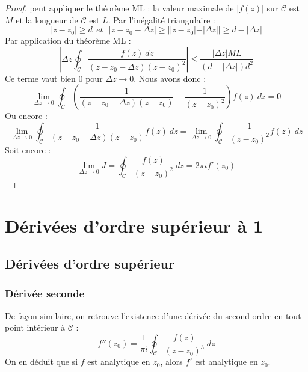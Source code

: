 \begin{proof}
	peut appliquer le théorème ML : la valeur maximale de $|f(z)|$ sur $\mathcal{C}$ est $M$ et la
	longueur de $\mathcal{C}$ est $L$. Par l'inégalité triangulaire :
	\begin{equation}
		|z-z_0| \geq d\ \ et\ \ \ |z-z_0-\Delta z| \geq ||z-z_0| - |\Delta z|| \geq d - |\Delta z|
	\end{equation}
	Par application du théorème ML :
	\begin{equation}
		\left|\Delta z\oint_\mathcal{C} \dfrac{f(z)\ dz}{(z-z_0-\Delta z)(z-z_0)^2}\right| \leq 
		\dfrac{|\Delta z|ML}{(d-|\Delta z|)d^2}
	\end{equation}
	Ce terme vaut bien 0 pour $\Delta z \rightarrow 0$. Nous avons donc :
	\begin{equation}
		\lim\limits_{\Delta z \rightarrow 0} \oint_\mathcal{C}\left(\dfrac{1}{(z-z_0-\Delta z)(z-z_0)} - 
		\dfrac{1}{(z-z_0)^2}\right)f(z)\ dz = 0
	\end{equation}
	Ou encore :
	\begin{equation}
		\lim\limits_{\Delta z \rightarrow 0} \oint_\mathcal{C}\dfrac{1}{(z-z_0-\Delta z)(z-z_0)}
		f(z)\ dz =
		\lim\limits_{\Delta z \rightarrow 0}\oint_\mathcal{ C}\dfrac{1}{(z-z_0)^2}f(z)\ dz
	\end{equation}
	Soit encore :
	\begin{equation}
		\lim\limits_{\Delta z \rightarrow 0} J = \oint_\mathcal{C}\frac{f(z)}{(z-z_0)^2}\ dz = 2\pi i
		f'(z_0)
	\end{equation}
\end{proof}
    
\section{Dérivées d'ordre supérieur à 1}
\subsection{Dérivées d'ordre supérieur}
\subsubsection{Dérivée seconde}
De façon similaire, on retrouve l'existence d'une dérivée du second ordre en tout point
intérieur à $\mathcal{C}$ :
\begin{equation}
	f''(z_0) = \frac{1}{\pi i}\oint_\mathcal{C}\dfrac{f(z)}{(z-z_0)^ 3}\ dz
\end{equation}
On en déduit que si $f$ est analytique en $z_0$, alors $f'$ est analytique en $z_0$.\ \\
		
